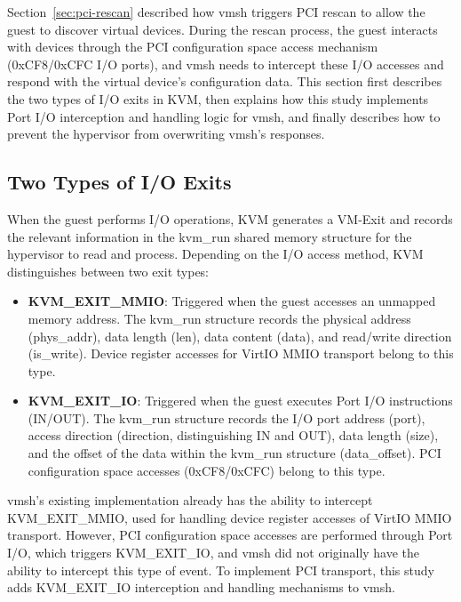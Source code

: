 \begin{ZhChapter}
Section~\ref{sec:pci-rescan} described how vmsh triggers PCI rescan to allow the guest to discover virtual devices. During the rescan process, the guest interacts with devices through the PCI configuration space access mechanism (0xCF8/0xCFC I/O ports), and vmsh needs to intercept these I/O accesses and respond with the virtual device's configuration data. This section first describes the two types of I/O exits in KVM, then explains how this study implements Port I/O interception and handling logic for vmsh, and finally describes how to prevent the hypervisor from overwriting vmsh's responses.

\subsection{Two Types of I/O Exits}
\label{sec:io-exit-types}

When the guest performs I/O operations, KVM generates a VM-Exit and records the relevant information in the kvm\_run shared memory structure for the hypervisor to read and process. Depending on the I/O access method, KVM distinguishes between two exit types:

\begin{itemize}
    \item \textbf{KVM\_EXIT\_MMIO}: Triggered when the guest accesses an unmapped memory address. The kvm\_run structure records the physical address (phys\_addr), data length (len), data content (data), and read/write direction (is\_write). Device register accesses for VirtIO MMIO transport belong to this type.

    \item \textbf{KVM\_EXIT\_IO}: Triggered when the guest executes Port I/O instructions (IN/OUT). The kvm\_run structure records the I/O port address (port), access direction (direction, distinguishing IN and OUT), data length (size), and the offset of the data within the kvm\_run structure (data\_offset). PCI configuration space accesses (0xCF8/0xCFC) belong to this type.
\end{itemize}

vmsh's existing implementation already has the ability to intercept KVM\_EXIT\_MMIO, used for handling device register accesses of VirtIO MMIO transport. However, PCI configuration space accesses are performed through Port I/O, which triggers KVM\_EXIT\_IO, and vmsh did not originally have the ability to intercept this type of event. To implement PCI transport, this study adds KVM\_EXIT\_IO interception and handling mechanisms to vmsh.


\end{ZhChapter}
